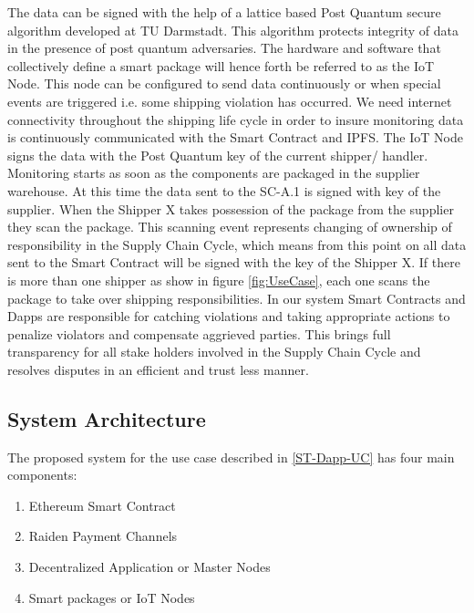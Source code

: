 The data can be signed with the help of a lattice based Post Quantum secure algorithm developed at TU Darmstadt. This algorithm protects integrity of data in the presence of post quantum adversaries. The hardware and software that collectively define a smart package will hence forth be referred to as the IoT Node. This node can be configured to send data continuously or when special events are triggered i.e. some shipping violation has occurred. We need internet connectivity throughout the shipping life cycle in order to insure monitoring data is continuously communicated with the Smart Contract and IPFS. The IoT Node signs the data with the Post Quantum key of the current shipper/ handler.  Monitoring starts as soon as the components are packaged in the supplier warehouse. At this time the data sent to the SC-A.1 is signed with key of the supplier. When the Shipper X takes possession of the package from the supplier they scan the package. This scanning event represents changing of ownership of responsibility in the Supply Chain Cycle, which means from this point on all data sent to the Smart Contract will be signed with the key of the Shipper X. If there is more than one shipper as show in figure \ref{fig:UseCase}, each one scans the package to take over shipping responsibilities. In our system Smart Contracts and Dapps are responsible for catching violations and taking appropriate actions to penalize violators and compensate aggrieved parties. This brings full transparency for all stake holders involved in the Supply Chain Cycle and resolves disputes in an efficient and trust less manner.

\vspace{0.5cm}
\subsection{System Architecture}
The proposed system for the use case described in \ref{ST-Dapp-UC} has four main components:
\begin{enumerate}
  \item Ethereum Smart Contract
  \item Raiden Payment Channels
  \item Decentralized Application or Master Nodes
  \item Smart packages or IoT Nodes
\end{enumerate} 

